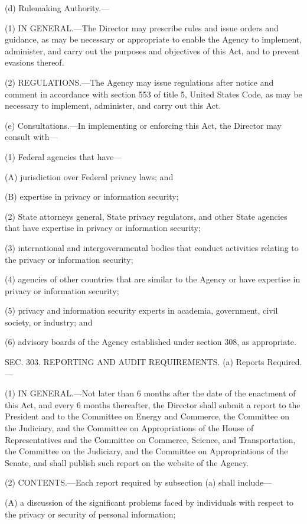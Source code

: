 (d) Rulemaking Authority.—

(1) IN GENERAL.—The Director may prescribe rules and issue orders and guidance, as may be necessary or appropriate to enable the Agency to implement, administer, and carry out the purposes and objectives of this Act, and to prevent evasions thereof.

(2) REGULATIONS.—The Agency may issue regulations after notice and comment in accordance with section 553 of title 5, United States Code, as may be necessary to implement, administer, and carry out this Act.

(e) Consultations.—In implementing or enforcing this Act, the Director may consult with—

(1) Federal agencies that have—

(A) jurisdiction over Federal privacy laws; and

(B) expertise in privacy or information security;

(2) State attorneys general, State privacy regulators, and other State agencies that have expertise in privacy or information security;

(3) international and intergovernmental bodies that conduct activities relating to the privacy or information security;

(4) agencies of other countries that are similar to the Agency or have expertise in privacy or information security;

(5) privacy and information security experts in academia, government, civil society, or industry; and

(6) advisory boards of the Agency established under section 308, as appropriate.


SEC. 303. REPORTING AND AUDIT REQUIREMENTS.
(a) Reports Required.—

(1) IN GENERAL.—Not later than 6 months after the date of the enactment of this Act, and every 6 months thereafter, the Director shall submit a report to the President and to the Committee on Energy and Commerce, the Committee on the Judiciary, and the Committee on Appropriations of the House of Representatives and the Committee on Commerce, Science, and Transportation, the Committee on the Judiciary, and the Committee on Appropriations of the Senate, and shall publish such report on the website of the Agency.

(2) CONTENTS.—Each report required by subsection (a) shall include—

(A) a discussion of the significant problems faced by individuals with respect to the privacy or security of personal information;

